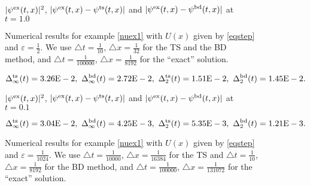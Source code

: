 \documentclass[leqno,final]{siamltex}
\numberwithin{equation}{section}
\newcounter{me}
\begin{document}
\begin{figure} \footnotesize
\begin{center}

$|\psi^{\rm ex}(t,x)|^2$, $|\psi^{\rm ex}(t,x)-\psi^{\rm
ts}(t,x)|$ and $|\psi^{\rm ex}(t,x)-\psi^{\rm bd}(t,x)|$ at
$t=1.0$\vspace{-1mm} \caption{Numerical results for example
\ref{nuex1} with $U(x)$ given by \eqref{eqstep} and ${{\varepsilon }}={\frac{{1}}{{2}}}$.
We use ${\triangle} t={\frac{{1}}{{10}}}$, ${\triangle} x={\frac{{1}}{{32}}}$ for the TS and the BD
method, and ${\triangle} t={\frac{{1}}{{100000}}}$, ${\triangle} x={\frac{{1}}{{8192}}}$ for the
``exact'' solution. \vspace{-3mm}}\label{fig16}
\[\Delta^{\rm ts}_\infty(t)=3.26{\rm{E}}-2,\
\Delta^{\rm bd}_\infty(t)=2.72{\rm{E}}-2,\
\Delta^{\rm ts}_2(t)=1.51{\rm{E}}-2,\
\Delta^{\rm bd}_2(t)=1.45{\rm{E}}-2.\]\vspace{1mm}


$|\psi^{\rm ex}(t,x)|^2$, $|\psi^{\rm ex}(t,x)-\psi^{\rm ts}(t,x)|$
and $|\psi^{\rm ex}(t,x)-\psi^{\rm bd}(t,x)|$ at $t=0.1$\vspace{-1mm}
\end{center}
\caption{Numerical results for example \ref{nuex1} with $U(x)$
given by \eqref{eqstep} and ${{\varepsilon }}={\frac{{1}}{{1024}}}$. We use ${\triangle}
t={\frac{{1}}{{10000}}}$, ${\triangle} x={\frac{{1}}{{16384}}}$ for the TS and ${\triangle}
t={\frac{{1}}{{10}}}$, ${\triangle} x={\frac{{1}}{{8192}}}$ for the BD method, and ${\triangle}
t={\frac{{1}}{{100000}}}$, ${\triangle} x={\frac{{1}}{{131072}}}$ for the ``exact''
solution. }\label{fig17}\vspace{-3mm}
\[\Delta^{\rm ts}_\infty(t)=3.04{\rm{E}}-2,\
\Delta^{\rm bd}_\infty(t)=4.25{\rm{E}}-3,\
\Delta^{\rm ts}_2(t)=5.35{\rm{E}}-3,\
\Delta^{\rm bd}_2(t)= 1.21{\rm{E}}-3.\]
\end{figure}
\end{document}
